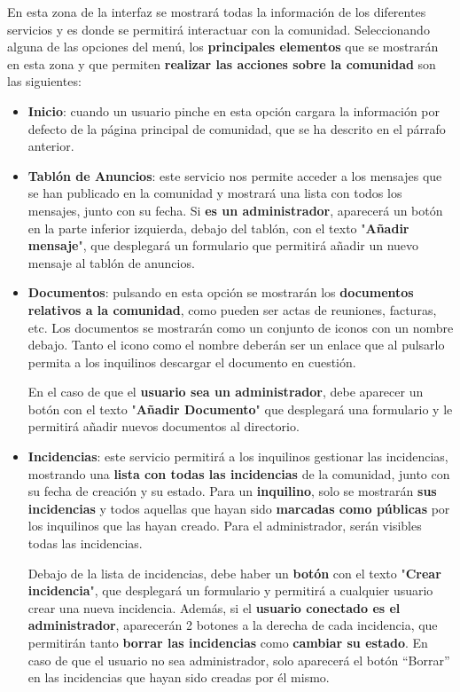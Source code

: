 \begin{appendices}
\begin{itemize}
\begin{itemize}
		En esta zona de la interfaz se mostrará todas la información de los diferentes servicios y es donde se permitirá interactuar con la comunidad. Seleccionando alguna de las opciones del menú, los \textbf{principales elementos} que se mostrarán en esta zona y que permiten \textbf{realizar las acciones sobre la comunidad} son las siguientes: 
		
		\begin{itemize}
			\item \textbf{Inicio}: cuando un usuario pinche en esta opción cargara la información por defecto de la página principal de comunidad, que se ha descrito en el párrafo anterior.
			
			\item \textbf{Tablón de Anuncios}: este servicio nos permite acceder a los mensajes que se han publicado en la comunidad y mostrará una lista con todos los mensajes, junto con su fecha. Si \textbf{es un administrador}, aparecerá un botón en la parte inferior izquierda, debajo del tablón, con el texto "\textbf{Añadir mensaje}", que desplegará un formulario que permitirá añadir un nuevo mensaje al tablón de anuncios.	
			
			\item \textbf{Documentos}: pulsando en esta opción se mostrarán los \textbf{documentos relativos a la comunidad}, como pueden ser actas de reuniones, facturas, etc. Los documentos se mostrarán como un conjunto de iconos con un nombre debajo. Tanto el icono como el nombre deberán ser un enlace que al pulsarlo permita a los inquilinos descargar el documento en cuestión. 
			
			En el caso de que el \textbf{usuario sea un administrador}, debe aparecer un botón con el texto "\textbf{Añadir Documento}" que desplegará una formulario y le permitirá añadir nuevos documentos al directorio. 
			
			\item \textbf{Incidencias}: este servicio permitirá a los inquilinos gestionar las incidencias, mostrando una \textbf{lista con todas las incidencias} de la comunidad, junto con su fecha de creación y su estado. Para un \textbf{inquilino}, solo se mostrarán \textbf{sus incidencias} y todos aquellas que hayan sido \textbf{marcadas como públicas} por los inquilinos que las hayan creado. Para el administrador, serán visibles todas las incidencias.
			
			Debajo de la lista de incidencias, debe haber un \textbf{botón} con el texto "\textbf{Crear incidencia}", que desplegará un formulario y permitirá a cualquier usuario crear una nueva incidencia. Además, si el \textbf{usuario conectado es el administrador}, aparecerán 2 botones a la derecha de cada incidencia, que permitirán tanto \textbf{borrar las incidencias} como \textbf{cambiar su estado}. En caso de que el usuario no sea administrador, solo aparecerá el botón ``Borrar'' en las incidencias que hayan sido creadas por él mismo.
			

\end{itemize}
\end{itemize}
\end{itemize}
\end{appendices}

